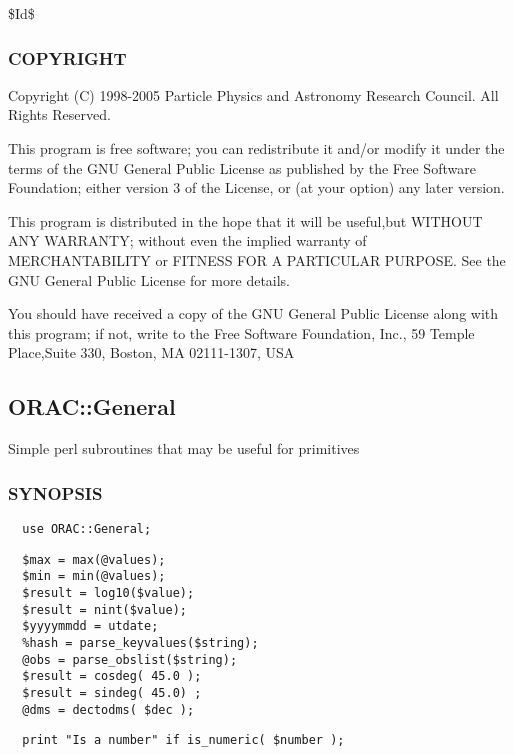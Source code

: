 \begin{description}
\begin{description}
\$Id\$

\subsubsection*{COPYRIGHT\label{ORAC::Frame::SCUBA_COPYRIGHT}}


Copyright (C) 1998-2005 Particle Physics and Astronomy Research
Council. All Rights Reserved.



This program is free software; you can redistribute it and/or modify it under
the terms of the GNU General Public License as published by the Free Software
Foundation; either version 3 of the License, or (at your option) any later
version.



This program is distributed in the hope that it will be useful,but WITHOUT ANY
WARRANTY; without even the implied warranty of MERCHANTABILITY or FITNESS FOR A
PARTICULAR PURPOSE. See the GNU General Public License for more details.



You should have received a copy of the GNU General Public License along with
this program; if not, write to the Free Software Foundation, Inc., 59 Temple
Place,Suite 330, Boston, MA  02111-1307, USA

\subsection{ORAC::General\label{ORAC::General}}


Simple perl subroutines that may be useful for primitives

\subsubsection*{SYNOPSIS\label{ORAC::General_SYNOPSIS}}
\begin{verbatim}
  use ORAC::General;
\end{verbatim}
\begin{verbatim}
  $max = max(@values);
  $min = min(@values);
  $result = log10($value);
  $result = nint($value);
  $yyyymmdd = utdate;
  %hash = parse_keyvalues($string);
  @obs = parse_obslist($string);
  $result = cosdeg( 45.0 );
  $result = sindeg( 45.0) ;
  @dms = dectodms( $dec );
\end{verbatim}
\begin{verbatim}
  print "Is a number" if is_numeric( $number );
\end{verbatim}

\end{description}
\end{description}
